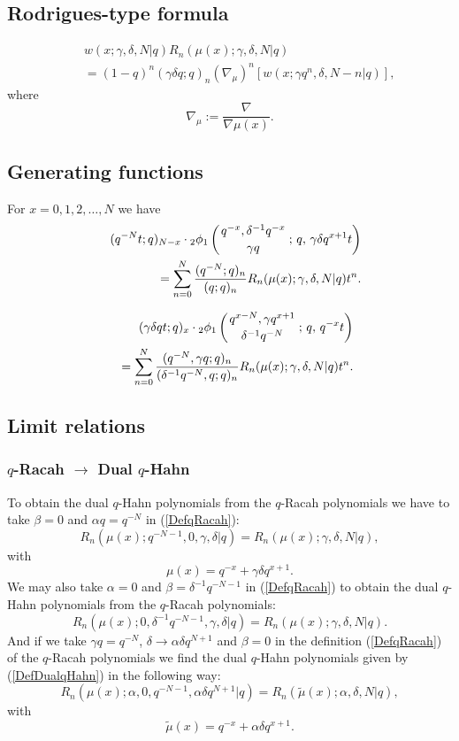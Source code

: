 \documentclass[envcountchap,graybox]{svmono}
\newcounter{rom}
\newcommand{\qhyp}[5]{\mbox{}_{#1}{\phi}_{#2}
\left(\genfrac{}{}{0pt}{}{#3}{#4}\,;\,q,\,#5\right)}
\begin{document}
\subsection*{Rodrigues-type formula}
\begin{eqnarray}
\label{RodDualqHahn}
& &w(x;\gamma,\delta,N|q)R_n(\mu(x);\gamma,\delta,N|q)\nonumber\\
& &{}=(1-q)^n(\gamma\delta q;q)_n
\left(\nabla_{\mu}\right)^n\left[w(x;\gamma q^n,\delta,N-n|q)\right],
\end{eqnarray}
where
$$\nabla_{\mu}:=\frac{\nabla}{\nabla\mu(x)}.$$

\subsection*{Generating functions} For $x=0,1,2,\ldots,N$ we have
\begin{eqnarray}
\label{GenDualqHahn1}
& &(q^{-N}t;q)_{N-x}\cdot\qhyp{2}{1}{q^{-x},\delta^{-1}q^{-x}}{\gamma q}{\gamma\delta q^{x+1}t}\nonumber\\
& &{}=\sum_{n=0}^N\frac{(q^{-N};q)_n}{(q;q)_n}R_n(\mu(x);\gamma,\delta,N|q)t^n.
\end{eqnarray}

\begin{eqnarray}
\label{GenDualqHahn2}
& &(\gamma\delta qt;q)_x\cdot\qhyp{2}{1}{q^{x-N},\gamma q^{x+1}}{\delta^{-1}q^{-N}}{q^{-x}t}\nonumber\\
& &{}=\sum_{n=0}^N
\frac{(q^{-N},\gamma q;q)_n}{(\delta^{-1}q^{-N},q;q)_n}R_n(\mu(x);\gamma,\delta,N|q)t^n.
\end{eqnarray}

\subsection*{Limit relations}

\subsubsection*{$q$-Racah $\rightarrow$ Dual $q$-Hahn}
To obtain the dual $q$-Hahn polynomials from the $q$-Racah polynomials we have to
take $\beta=0$ and $\alpha q=q^{-N}$ in (\ref{DefqRacah}):
$$R_n(\mu(x);q^{-N-1},0,\gamma,\delta|q)=R_n(\mu(x);\gamma,\delta,N|q),$$
with
$$\mu(x)=q^{-x}+\gamma\delta q^{x+1}.$$
We may also take $\alpha=0$ and $\beta=\delta^{-1}q^{-N-1}$ in (\ref{DefqRacah}) to obtain
the dual $q$-Hahn polynomials from the $q$-Racah polynomials:
$$R_n(\mu(x);0,\delta^{-1}q^{-N-1},\gamma,\delta|q)=R_n(\mu(x);\gamma,\delta,N|q).$$
And if we take $\gamma q=q^{-N}$, $\delta\rightarrow\alpha\delta q^{N+1}$ and $\beta=0$ in the
definition (\ref{DefqRacah}) of the $q$-Racah polynomials we find the dual
$q$-Hahn polynomials given by (\ref{DefDualqHahn}) in the following way:
$$R_n(\mu(x);\alpha,0,q^{-N-1},\alpha\delta q^{N+1}|q)=R_n({\tilde \mu}(x);\alpha,\delta,N|q),$$
with
$${\tilde \mu}(x)=q^{-x}+\alpha\delta q^{x+1}.$$
\end{document}
